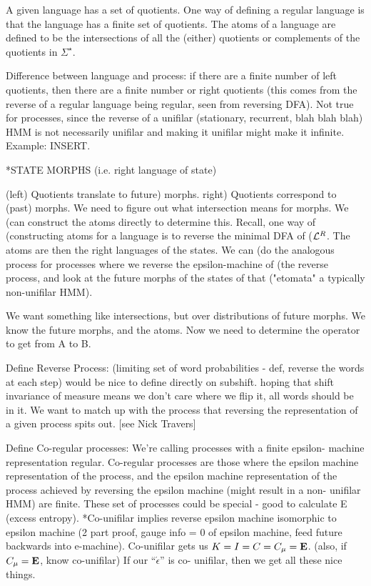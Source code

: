 \documentclass[prl,twocolumn,showpacs,superscriptaddress,preprintnumbers,floatfix]{revtex4-1}
\newcommand{\etomata}{\ensuremath{\acute{\epsilon}}\text{tomata}}
\begin{document}
A given language \Language has a set of quotients.  One way of defining a
regular language is that the language has a finite set of quotients.  The atoms
of a language are defined to be the intersections of all the (either) quotients
or complements of the quotients in $\Sigma^{\star}$.

Difference between language and process: if there are a finite number of left
quotients, then there are a finite number or right quotients (this comes from
the reverse of a regular language being regular, seen from reversing DFA).  Not
true for processes, since the reverse of a unifilar (stationary, recurrent, blah
blah blah) HMM is not necessarily unifilar and making it unifilar might make it
infinite. Example: INSERT.

*STATE MORPHS (i.e. right language of state)

(left) Quotients translate to future) morphs. right) Quotients correspond to
(past) morphs.  We need to figure out what intersection means for morphs.  We
(can construct the atoms directly to determine this.  Recall, one way of
(constructing atoms for a language \Language is to reverse the minimal DFA of
($\mathcal{L}^{R}$.  The atoms are then the right languages of the states. We can
(do the analogous process for processes where we reverse the epsilon-machine of
(the reverse process, and look at the future morphs of the states of that
("etomata" a typically non-unifilar HMM).

We want something like intersections, but over distributions of future morphs.
We know the future morphs, and the atoms.  Now we need to determine the operator
to get from A to B.

Define Reverse Process: (limiting set of word probabilities - def, reverse the
words at each step) would be nice to define directly on subshift. hoping that
shift invariance of measure means we don't care where we flip it, all words
should be in it.  We want to match up with the process that reversing the
\eM representation of a given process spits out. [see Nick Travers]

Define Co-regular processes: We're calling processes with a finite epsilon-
machine representation regular. Co-regular processes are those where the epsilon
machine representation of the process, and the epsilon machine representation of
the process achieved by reversing the epsilon machine (might result in a non-
unifilar HMM) are finite.  These set of processes could be special - good to
calculate E (excess entropy).  *Co-unifilar implies reverse epsilon machine
isomorphic to epsilon machine (2 part proof, gauge info = 0 of epsilon machine,
feed future backwards into e-machine). Co-unifilar gets us $K = I = C = C_\mu
= {\bf E}$.  (also, if $C_\mu = {\bf E}$, know co-unifilar) If our ``\etomata'' is co-
unifilar, then we get all these nice things.
\end{document}
